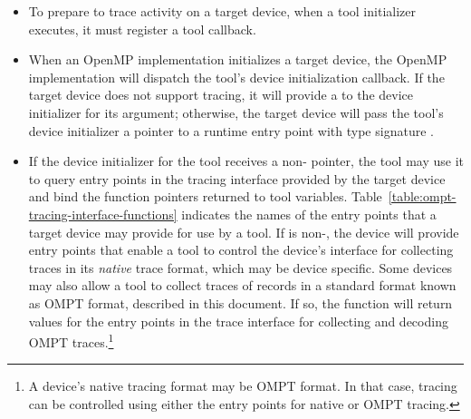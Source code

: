 \begin{itemize}
\item To prepare to trace activity on a target device, when a tool
  initializer executes, it must register a tool 
   callback.
\item When an OpenMP implementation initializes a target device, the
  OpenMP implementation will dispatch the tool's device initialization
  callback. If the target device does not support tracing, it
  will provide a  to the device initializer for its
   argument; otherwise, the target device will pass the
  tool's device initializer a pointer to a runtime
  entry point with type signature .
\item If the device initializer for the tool receives a
  non-  pointer, the tool may use it to query
  entry points in the tracing interface provided by the target device
  and bind the function pointers returned to tool variables.
  Table~\ref{table:ompt-tracing-interface-functions} indicates the
  names of the entry points that a target device may provide for use
  by a tool.  If  is non-, the device will
  provide entry points that enable a tool to control the device's
  interface for collecting traces in its \emph{native} trace format,
  which may be device specific. Some devices may also allow a tool to
  collect traces of records in a standard format known as OMPT format,
  described in this document. If so, the  function will
  return values for the entry points in the trace interface for
  collecting and decoding OMPT traces.\footnote{A device's native
    tracing format may be OMPT format. In that case, tracing can be
    controlled using either the entry points for native or OMPT
    tracing.}


\end{itemize}
